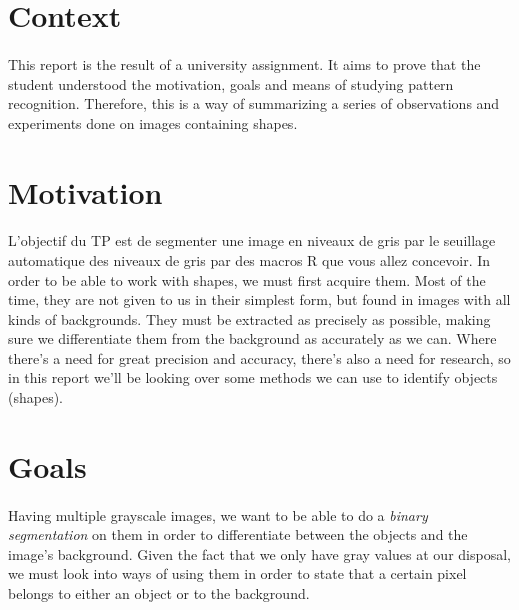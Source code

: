 \section{Context}
\paragraph{}
This report is the result of a university assignment.
It aims to prove that the student understood the motivation, goals and means of studying pattern recognition.
Therefore, this is a way of summarizing a series of observations and experiments done on images containing shapes.

\section{Motivation}
\paragraph{}
L’objectif du TP est de segmenter une image en niveaux de gris par le seuillage automatique des niveaux de gris par des macros R que vous allez concevoir.
In order to be able to work with shapes, we must first acquire them.
Most of the time, they are not given to us in their simplest form, but found in images with all kinds of backgrounds.
They must be extracted as precisely as possible, making sure we differentiate them from the background as accurately as we can.
Where there's a need for great precision and accuracy, there's also a need for research, so in this report we'll be looking over some methods we can use to identify objects (shapes).

\section{Goals}
\paragraph{}
Having multiple grayscale images, we want to be able to do a \emph{binary segmentation} on them in order to differentiate between the objects and the image's background.
Given the fact that we only have gray values at our disposal, we must look into ways of using them in order to state that a certain pixel belongs to either an object or to the background.
